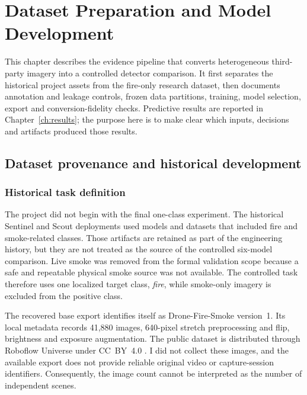 \chapter{Dataset Preparation and Model Development}
\label{ch:data-models}

This chapter describes the evidence pipeline that converts heterogeneous
third-party imagery into a controlled detector comparison. It first separates
the historical project assets from the fire-only research dataset, then
documents annotation and leakage controls, frozen data partitions, training,
model selection, export and conversion-fidelity checks. Predictive results are
reported in Chapter~\ref{ch:results}; the purpose here is to make clear which
inputs, decisions and artifacts produced those results.

\section{Dataset provenance and historical development}
\label{sec:data-models:1}

\subsection{Historical task definition}

The project did not begin with the final one-class experiment. The historical
Sentinel and Scout deployments used models and datasets that included fire and
smoke-related classes. Those artifacts are retained as part of the engineering
history, but they are not treated as the source of the controlled six-model
comparison. Live smoke was removed from the formal validation scope because a
safe and repeatable physical smoke source was not available. The controlled
task therefore uses one localized target class, \emph{fire}, while smoke-only
imagery is excluded from the positive class.

The recovered base export identifies itself as Drone-Fire-Smoke version~1. Its
local metadata records 41,880 images, 640-pixel stretch preprocessing and
flip, brightness and exposure augmentation. The public dataset is distributed
through Roboflow Universe under CC~BY~4.0 \cite{DroneFireSmokeDataset}. I did
not collect these images, and the available export does not provide reliable
original video or capture-session identifiers. Consequently, the image count
cannot be interpreted as the number of independent scenes.

